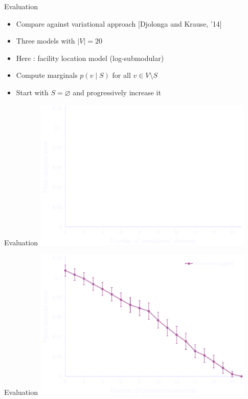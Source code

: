 \documentclass[mathserif]{beamer}
\newcommand{\qcite}[1]{{\scriptsize\color{col2}[#1]}}
\begin{document}
\begin{frame}{Evaluation}
\vspace{0.5em}
\begin{itemize}
\item Compare against variational approach \qcite{Djolonga and Krause, '14}
\vspace{1.5em}
\item Three models with $|V| = 20$
\vspace{1.5em}
\item Here : facility location model (log-submodular)
\vspace{1.5em}
\item Compute marginals $p(v \mid S)$ for all $v \in V \setminus S$
\vspace{1.5em}
\item Start with $S = \varnothing$ and progressively increase it
\end{itemize}
\end{frame}

\begin{frame}{Evaluation}
\vspace{1em}
\centering
\includegraphics[width=4.15in,trim=6 0 0 0,clip]{figures/floc_0.pdf}
\end{frame}

\begin{frame}{Evaluation}
\vspace{1em}
\centering
\includegraphics[width=4.15in,trim=6 0 0 0,clip]{figures/floc_1.pdf}
\end{frame}
\end{document}
